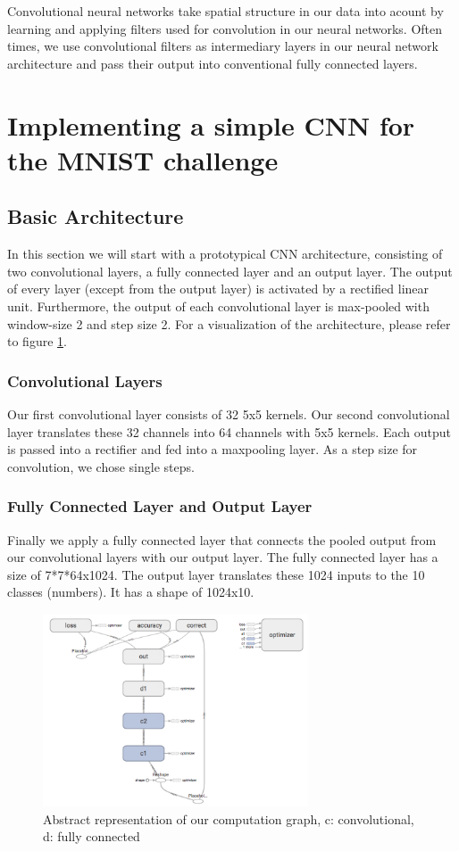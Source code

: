 \documentclass{article}
\begin{document}
Convolutional neural networks take spatial structure in our data into acount by learning and applying filters used for convolution in our neural networks. Often times, we use convolutional filters as intermediary layers in our neural network architecture and pass their output into conventional fully connected layers.

\section{Implementing a simple CNN for the MNIST challenge}
\subsection{Basic Architecture}
In this section we will start with a prototypical CNN architecture, consisting of two convolutional layers, a fully connected layer and an output layer. The output of every layer (except from the output layer) is activated by a rectified linear unit. Furthermore, the output of each convolutional layer is max-pooled with window-size 2 and step size 2. For a visualization of the architecture, please refer to figure \ref{std_graph}.

\subsubsection*{Convolutional Layers}
Our first convolutional layer consists of 32 5x5 kernels. Our second convolutional layer translates these 32 channels into 64 channels with 5x5 kernels. Each output is passed into a rectifier and fed into a maxpooling layer. As a step size for convolution, we chose single steps.

\subsubsection*{Fully Connected Layer and Output Layer}
Finally we apply a fully connected layer that connects the pooled output from our convolutional layers with our output layer. The fully connected layer has a size of 7*7*64x1024. The output layer translates these 1024 inputs to the 10 classes (numbers). It has a shape of 1024x10.

\begin{figure}
\centering
\includegraphics[width=0.7\textwidth]{imgs/std_graph.png}
\caption{Abstract representation of our computation graph, c: convolutional, d: fully connected}\label{std_graph}
\end{figure}
\end{document}
